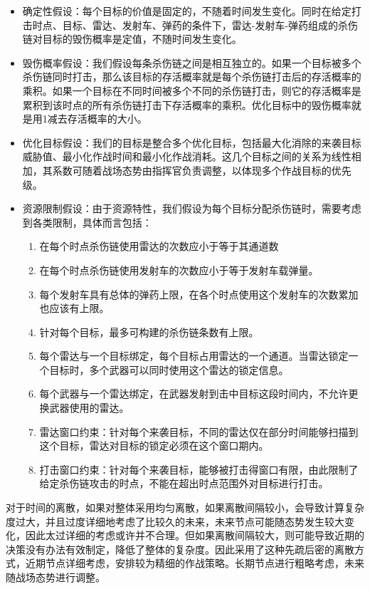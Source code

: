 \begin{itemize}
    \item 确定性假设：每个目标的价值是固定的，不随着时间发生变化。同时在给定打击时点、目标、雷达、发射车、弹药的条件下，雷达-发射车-弹药组成的杀伤链对目标的毁伤概率是定值，不随时间发生变化。
    \item 毁伤概率假设：我们假设每条杀伤链之间是相互独立的。如果一个目标被多个杀伤链同时打击，那么该目标的存活概率就是每个杀伤链打击后的存活概率的乘积。如果一个目标在不同时间被多个不同的杀伤链打击，则它的存活概率是累积到该时点的所有杀伤链打击下存活概率的乘积。优化目标中的毁伤概率就是用1减去存活概率的大小。
    \item 优化目标假设：我们的目标是整合多个优化目标，包括最大化消除的来袭目标威胁值、最小化作战时间和最小化作战消耗。这几个目标之间的关系为线性相加，其系数可随着战场态势由指挥官负责调整，以体现多个作战目标的优先级。
    \item 资源限制假设：由于资源特性，我们假设为每个目标分配杀伤链时，需要考虑到各类限制，具体而言包括：
    \begin{enumerate}[label=\roman*.]
        \item 在每个时点杀伤链使用雷达的次数应小于等于其通道数
        \item 在每个时点杀伤链使用发射车的次数应小于等于发射车载弹量。
        \item 每个发射车具有总体的弹药上限，在各个时点使用这个发射车的次数累加也应该有上限。
        \item 针对每个目标，最多可构建的杀伤链条数有上限。
        \item 每个雷达与一个目标绑定，每个目标占用雷达的一个通道。当雷达锁定一个目标时，多个武器可以同时使用这个雷达的锁定信息。
        \item 每个武器与一个雷达绑定，在武器发射到击中目标这段时间内，不允许更换武器使用的雷达。
        \item 雷达窗口约束：针对每个来袭目标，不同的雷达仅在部分时间能够扫描到这个目标，雷达对目标的锁定必须在这个窗口期内。
        \item 打击窗口约束：针对每个来袭目标，能够被打击得窗口有限，由此限制了给定杀伤链攻击的时点，不能在超出时点范围外对目标进行打击。
    \end{enumerate}
\end{itemize}

对于时间的离散，如果对整体采用均匀离散，如果离散间隔较小，会导致计算复杂度过大，并且过度详细地考虑了比较久的未来，未来节点可能随态势发生较大变化，因此太过详细的考虑或许并不合理。但如果离散间隔较大，则可能导致近期的决策没有办法有效制定，降低了整体的复杂度。因此采用了这种先疏后密的离散方式，近期节点详细考虑，安排较为精细的作战策略。长期节点进行粗略考虑，未来随战场态势进行调整。

